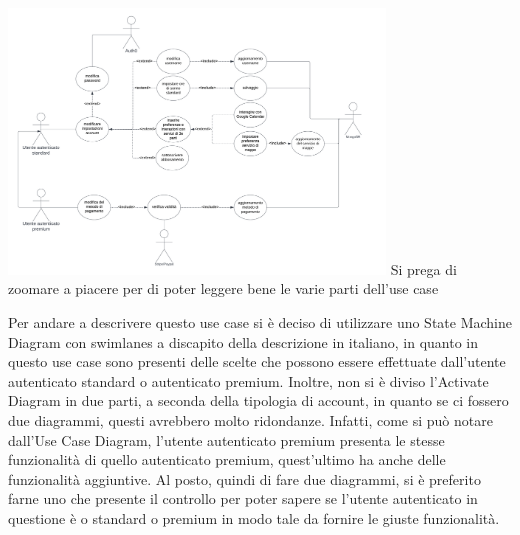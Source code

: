 \begin{listaPersonale}[UC]{}
\begin{listaPersonale2}[UC] {}
        



    \end{listaPersonale2}




    \newpage

    \begin{center}
        \includegraphics[width=0.75\textwidth, height = 0.35\textheight]{img/Diagrammi/UseCases/ImpostazioniAccount.png}
        Si prega di zoomare a piacere per di poter leggere bene le varie parti dell'use case
    \end{center}
    Per andare a descrivere questo use case si è deciso di utilizzare uno State Machine Diagram con swimlanes a discapito della descrizione in italiano, in quanto in questo use case sono presenti delle scelte che possono essere effettuate dall'utente autenticato standard o autenticato premium. Inoltre, non si è diviso l'Activate Diagram in due parti, a seconda della tipologia di account, in quanto se ci fossero due diagrammi, questi avrebbero molto ridondanze. Infatti, come si può notare dall'Use Case Diagram, l'utente autenticato premium presenta le stesse funzionalità di quello autenticato premium, quest'ultimo ha anche delle funzionalità aggiuntive. Al posto, quindi di fare due diagrammi, si è preferito farne uno che presente il controllo per poter sapere se l'utente autenticato in questione è o standard o premium in modo tale da fornire le giuste funzionalità.

\end{listaPersonale}

